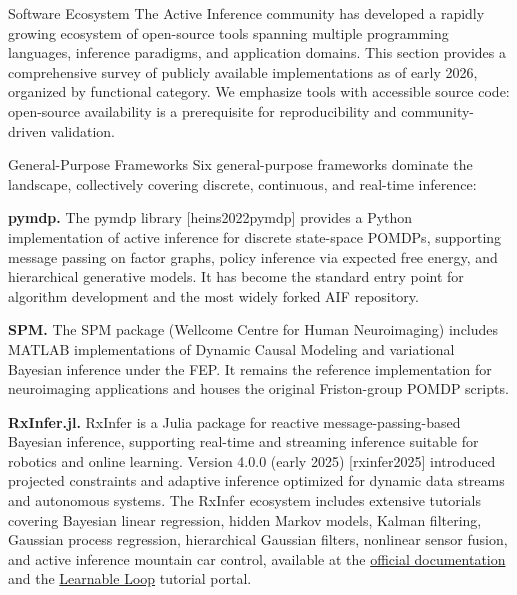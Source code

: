 \documentclass[
  ignorenonframetext,
]{beamer}
\providecommand{\citep}[1]{[#1]}
\begin{document}
\begin{frame}{Software Ecosystem}
\protect{}\label{software-ecosystem}
The Active Inference community has developed a rapidly growing ecosystem
of open-source tools spanning multiple programming languages, inference
paradigms, and application domains. This section provides a
comprehensive survey of publicly available implementations as of early
2026, organized by functional category. We emphasize tools with
accessible source code: open-source availability is a prerequisite for
reproducibility and community-driven validation.

\begin{block}{General-Purpose Frameworks}
\protect{}\label{general-purpose-frameworks}
Six general-purpose frameworks dominate the landscape, collectively
covering discrete, continuous, and real-time inference:

\textbf{pymdp.} The pymdp library \citep{heins2022pymdp} provides a
Python implementation of active inference for discrete state-space
POMDPs, supporting message passing on factor graphs, policy inference
via expected free energy, and hierarchical generative models. It has
become the standard entry point for algorithm development and the most
widely forked AIF repository.

\textbf{SPM.} The SPM package (Wellcome Centre for Human Neuroimaging)
includes MATLAB implementations of Dynamic Causal Modeling and
variational Bayesian inference under the FEP. It remains the reference
implementation for neuroimaging applications and houses the original
Friston-group POMDP scripts.

\textbf{RxInfer.jl.} RxInfer is a Julia package for reactive
message-passing-based Bayesian inference, supporting real-time and
streaming inference suitable for robotics and online learning. Version
4.0.0 (early 2025) \citep{rxinfer2025} introduced projected constraints
and adaptive inference optimized for dynamic data streams and autonomous
systems. The RxInfer ecosystem includes extensive tutorials covering
Bayesian linear regression, hidden Markov models, Kalman filtering,
Gaussian process regression, hierarchical Gaussian filters, nonlinear
sensor fusion, and active inference mountain car control, available at
the \href{https://reactivebayes.github.io/RxInfer.jl/stable/}{official
documentation} and the \href{https://learnableloop.com/}{Learnable Loop}
tutorial portal.


\end{block}
\end{frame}
\end{document}
